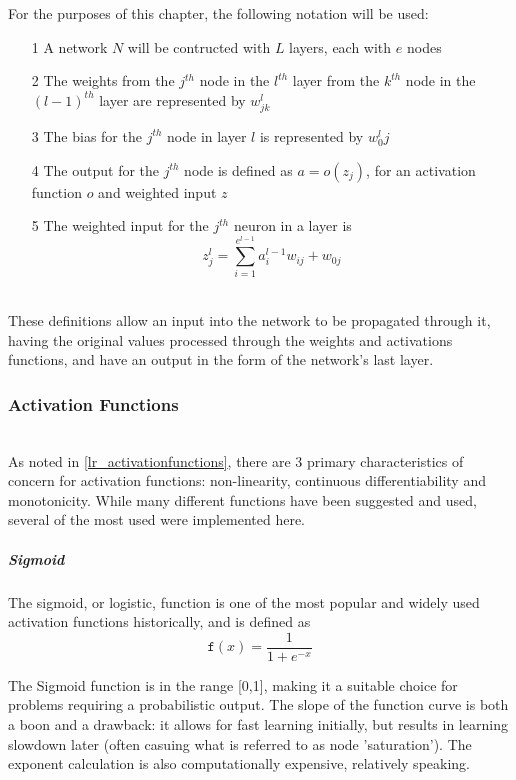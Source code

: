 \documentclass[a4paper,11pt,oneside]{article}
\theoremstyle{plain}
\theoremstyle{definition}
\begin{document}
For the purposes of this chapter, the following notation will be used:

\begin{itemize}
\item[1] A network $N$ will be contructed with $L$ layers, each with $e$ nodes
\item[2] The weights from the $j^{th}$ node in the $l^{th}$ layer from the $k^{th}$ node in the $(l-1)^{th}$ layer are represented by $w^l_{jk}$
\item[3] The bias for the $j^{th}$ node in layer $l$ is represented by $w^l_0j$
\item[4] The output for the $j^{th}$ node is defined as $a = o(z_j)$, for an activation function $o$ and weighted input $z$
\item[5] The weighted input for the $j^{th}$ neuron in a layer is 
\begin{equation}\label{eq_weighted_input}
	z^l_j=\sum_{i=1}^{e^{l-1}}{a^{l-1}_iw_{ij}} + w_{0j}
\end{equation}
\end{itemize}
~\\
These definitions allow an input into the network to be propagated through it, having the original values processed through the weights and activations functions, and have an output in the form of the network's last layer.

\subsubsection{Activation Functions}\label{imp_activation_functions}
~\\
As noted in \ref{lr_activationfunctions}, there are 3 primary characteristics of concern for activation functions: non-linearity, continuous differentiability and monotonicity. While many different functions have been suggested and used, several of the most used were implemented here.

\subparagraph{Sigmoid}

The sigmoid, or logistic, function is one of the most popular and widely used activation functions historically, and is defined as 
\begin{equation}\label{func_sigmoid}
\texttt{f}(x) = \frac{1}{1 + e^{-x}}
\end{equation}

The Sigmoid function is in the range [0,1], making it a suitable choice for problems requiring a probabilistic output. The slope of the function curve is both a boon and a drawback: it allows for fast learning initially, but results in learning slowdown later (often casuing what is referred to as node 'saturation'). The exponent calculation is also computationally expensive, relatively speaking.
\end{document}
